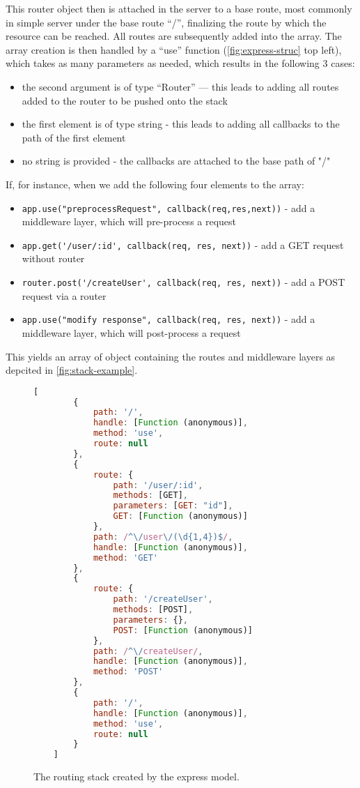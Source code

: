 This router object then is attached in the server to a base route, most commonly in  simple server under the base route “/”, finalizing the route by which the resource can be reached. All routes are subsequently added into the array. The array creation is then handled by a “use” function (\autoref{fig:express-struc} top left), which takes as many parameters as needed, which results in the following 3 cases:
\begin{itemize}
    \item  the second argument is of type “Router” — this leads to adding all routes added to the router to be pushed onto the stack
    \item  the first element is of type string - this leads to adding all callbacks to the path of the first element
    \item  no string is provided - the callbacks are attached to the base path of "/"
\end{itemize}
If, for instance, when we add the following four elements to the array:    
\begin{itemize}
    \item \lstinline{app.use("preprocessRequest", callback(req,res,next))} - add a middleware layer, which will pre-process a request
    \item \lstinline{app.get('/user/:id', callback(req, res, next))} - add a GET request without router
    \item \lstinline{router.post('/createUser', callback(req, res, next))} - add a POST request via a router
    \item \lstinline{app.use("modify response", callback(req, res, next))} - add a middleware layer, which will post-process a request
\end{itemize}
This yields an array of object containing the routes and middleware layers as depcited in \autoref{fig:stack-example}.
\begin{figure}[ht]
	\begin{lstlisting}[language=JavaScript, gobble=4]
    [
        {
            path: '/',
            handle: [Function (anonymous)],
            method: 'use',
            route: null
        },
        {
            route: {
                path: '/user/:id',
                methods: [GET],
                parameters: [GET: "id"],
                GET: [Function (anonymous)]
            },
            path: /^\/user\/(\d{1,4})$/,
            handle: [Function (anonymous)],
            method: 'GET'
        },
        {
            route: {
                path: '/createUser',
                methods: [POST],
                parameters: {},
                POST: [Function (anonymous)]
            },
            path: /^\/createUser/,
            handle: [Function (anonymous)],
            method: 'POST'
        },
        {
            path: '/',
            handle: [Function (anonymous)],
            method: 'use',
            route: null
        }
    ]
	\end{lstlisting}
	\caption{The routing stack created by the express model.}
	\label{fig:stack-example}
\end{figure}
